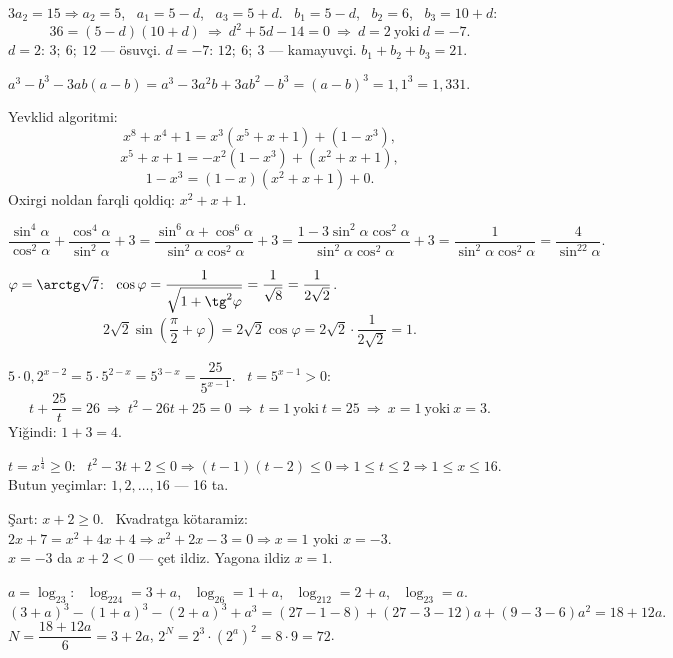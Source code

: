 $3a_2=15\Rightarrow a_2=5$, \ $a_1=5-d$, \ $a_3=5+d$. \ $b_1=5-d$, \ $b_2=6$, \ $b_3=10+d$:
\[36=(5-d)(10+d)\ \Rightarrow\ d^2+5d-14=0\ \Rightarrow\ d=2\ \text{yoki}\ d=-7.\]
$d=2$: $3;\ 6;\ 12$ — ösuvçi. \quad $d=-7$: $12;\ 6;\ 3$ — kamayuvçi. \quad $b_1+b_2+b_3=21$.

$a^3-b^3-3ab(a-b)=a^3-3a^2b+3ab^2-b^3=(a-b)^3=1{,}1^3=1{,}331$.

Yevklid algoritmi:
\[x^8+x^4+1=x^3\left(x^5+x+1\right)+\left(1-x^3\right),\]
\[x^5+x+1=-x^2\left(1-x^3\right)+\left(x^2+x+1\right),\]
\[1-x^3=(1-x)\left(x^2+x+1\right)+0.\]
Oxirgi noldan farqli qoldiq: $x^2+x+1$.

\[\frac{\sin^4\alpha}{\cos^2\alpha}+\frac{\cos^4\alpha}{\sin^2\alpha}+3=\frac{\sin^6\alpha+\cos^6\alpha}{\sin^2\alpha\cos^2\alpha}+3=\frac{1-3\sin^2\alpha\cos^2\alpha}{\sin^2\alpha\cos^2\alpha}+3=\frac1{\sin^2\alpha\cos^2\alpha}=\frac4{\sin^22\alpha}.\]

$\varphi=\arctg\sqrt7$: \ $\cos\varphi=\dfrac1{\sqrt{1+\tg^2\varphi}}=\dfrac1{\sqrt8}=\dfrac1{2\sqrt2}$.
\[2\sqrt2\sin\left(\frac\pi2+\varphi\right)=2\sqrt2\cos\varphi=2\sqrt2\cdot\frac1{2\sqrt2}=1.\]

$5\cdot0{,}2^{x-2}=5\cdot5^{2-x}=5^{3-x}=\dfrac{25}{5^{x-1}}$. \ $t=5^{x-1}>0$:
\[t+\frac{25}t=26\ \Rightarrow\ t^2-26t+25=0\ \Rightarrow\ t=1\ \text{yoki}\ t=25\ \Rightarrow\ x=1\ \text{yoki}\ x=3.\]
Yiğindi: $1+3=4$.

$t=x^{\frac14}\ge0$: \ $t^2-3t+2\le0\Rightarrow (t-1)(t-2)\le0\Rightarrow 1\le t\le2\Rightarrow 1\le x\le16$.\\
Butun yeçimlar: $1,2,\dots,16$ — 16 ta.

Şart: $x+2\ge0$. \ Kvadratga kötaramiz: $2x+7=x^2+4x+4\Rightarrow x^2+2x-3=0\Rightarrow x=1$ yoki $x=-3$.\\
$x=-3$ da $x+2<0$ — çet ildiz. Yagona ildiz $x=1$.

$a=\log_23$: \ $\log_224=3+a$, \ $\log_26=1+a$, \ $\log_212=2+a$, \ $\log_23=a$.
\[(3+a)^3-(1+a)^3-(2+a)^3+a^3=(27-1-8)+(27-3-12)a+(9-3-6)a^2=18+12a.\]
$N=\dfrac{18+12a}6=3+2a$, \quad $2^N=2^3\cdot\left(2^{a}\right)^2=8\cdot9=72$.

